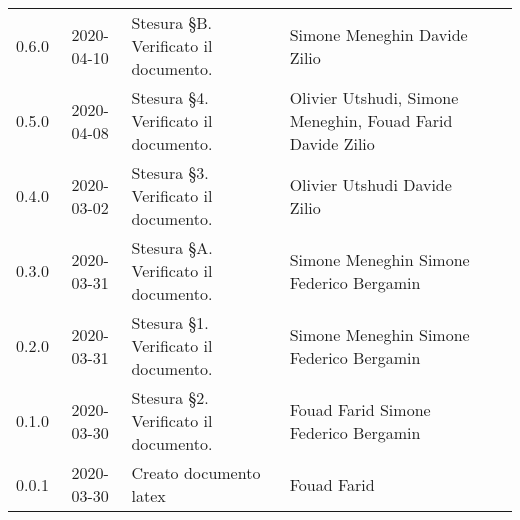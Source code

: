 {\begin{longtable}{ c c  C{4cm}  C{3.5cm}  C{3.5cm} }
		0.6.0 & 2020-04-10 & Stesura \S B. Verificato il documento. & Simone Meneghin \newline Davide Zilio&\prog{} \newline \ver{}\\
		0.5.0 & 2020-04-08 & Stesura \S 4. Verificato il documento. & Olivier Utshudi, Simone Meneghin, Fouad Farid \newline Davide Zilio &\prog{} \newline \prog{} \newline \prog{} \newline \ver{} \\
		0.4.0 & 2020-03-02 & Stesura \S 3. Verificato il documento. & Olivier Utshudi \newline Davide Zilio &\prog{} \newline \ver{} \\
		0.3.0 & 2020-03-31 & Stesura \S A. Verificato il documento. & Simone Meneghin \newline Simone Federico Bergamin&\prog{} \newline \ver{} \\
		0.2.0 & 2020-03-31 & Stesura \S 1. Verificato il documento. & Simone Meneghin \newline Simone Federico Bergamin&\prog{} \newline \ver{} \\
		0.1.0 & 2020-03-30 & Stesura \S 2. Verificato il documento. & Fouad Farid \newline Simone Federico Bergamin &\prog{} \newline \ver{} \\
		0.0.1 & 2020-03-30 & Creato documento latex & Fouad Farid &\prog{}\\		
		
	\end{longtable}

}